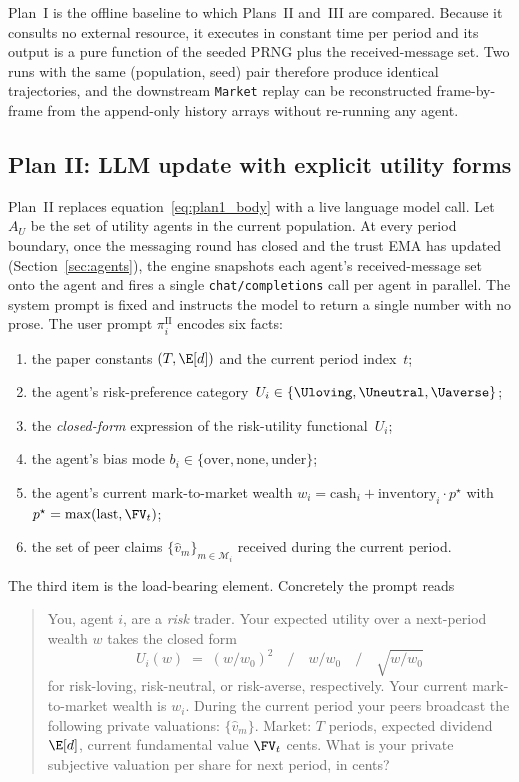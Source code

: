 Plan~I is the offline baseline to which Plans~II and~III are compared.
Because it consults no external resource, it executes in constant
time per period and its output is a pure function of the seeded
PRNG plus the received-message set. Two runs with the same
(population, seed) pair therefore produce identical trajectories,
and the downstream \texttt{Market} replay can be reconstructed
frame-by-frame from the append-only history arrays without
re-running any agent.

\subsection{Plan II: LLM update with explicit utility forms}
\label{sec:plan2}

Plan~II replaces equation~\eqref{eq:plan1_body} with a live language
model call. Let $A_U$ be the set of utility agents in the current
population. At every period boundary, once the messaging round has
closed and the trust EMA has updated (Section~\ref{sec:agents}), the
engine snapshots each agent's received-message set onto the agent
and fires a single \texttt{chat/completions} call per agent in
parallel. The system prompt is fixed and instructs the model to
return a single number with no prose. The user prompt
$\pi_i^{\text{II}}$ encodes six facts:
\begin{enumerate}
\item the paper constants $(T,\E[d])$ and the current period index~$t$;
\item the agent's risk-preference category~$U_i\in\{\Uloving,\Uneutral,\Uaverse\}$;
\item the \emph{closed-form} expression of the risk-utility functional~$U_i$;
\item the agent's bias mode $b_i\in\{\text{over},\text{none},\text{under}\}$;
\item the agent's current mark-to-market wealth
$w_i = \text{cash}_i + \text{inventory}_i\cdot p^\star$ with
$p^\star=\max(\text{last}, \FV_t)$;
\item the set of peer claims $\{\hat v_m\}_{m\in\mathcal{M}_i}$ received during
the current period.
\end{enumerate}
The third item is the load-bearing element. Concretely the prompt
reads
\begin{quote}\small
You, agent $i$, are a \emph{risk} trader. Your expected utility over
a next-period wealth $w$ takes the closed form
\[
U_i(w) \;=\; (w/w_0)^2 \quad\text{/}\quad w/w_0 \quad\text{/}\quad \sqrt{w/w_0}
\]
for risk-loving, risk-neutral, or risk-averse, respectively. Your
current mark-to-market wealth is $w_i$. During the current period
your peers broadcast the following private valuations:
$\{\hat v_m\}$. Market: $T$ periods, expected dividend $\E[d]$,
current fundamental value $\FV_t$ cents. What is your private
subjective valuation per share for next period, in cents?
\end{quote}
